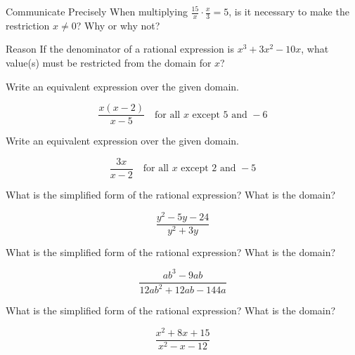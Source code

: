 \documentclass{article}
\newenvironment{practice}[2]{}{}        %
\newcommand{\answer}[1]{}               %
\begin{document}
\begin{practice}{18}{2}
Communicate Precisely When multiplying \(\frac{15}{x}\cdot\frac{x}{3}=5\), is it necessary to make the restriction \(x\ne0\)? Why or why not?
\answer{Yes; even though the factor of \(x\) was canceled out, the original fractions cannot be undefined, so the restriction is necessary.}
\end{practice}

\begin{practice}{19}{2}
Reason If the denominator of a rational expression is \(x^3+3x^2-10x\), what value(s) must be restricted from the domain for \(x\)?
\answer{\(-5\), \(0\), \(2\)}
\end{practice}

\begin{practice}{20}{1}
Write an equivalent expression over the given domain.

\[
\frac{x(x-2)}{x-5}\quad \text{for all }x\text{ except }5\text{ and }-6
\]
\answer{\(\frac{x^3+4x^2-12x}{x^2+x-30}\)}
\end{practice}

\begin{practice}{21}{1}
Write an equivalent expression over the given domain.

\[
\frac{3x}{x-2}\quad \text{for all }x\text{ except }2\text{ and }-5
\]
\answer{\(\frac{3x^2+15x}{x^2+3x-10}\)}
\end{practice}

\begin{practice}{22}{1}
What is the simplified form of the rational expression? What is the domain?

\[
\frac{y^2-5y-24}{y^2+3y}
\]
\answer{\(\frac{y-8}{y}\) for all \(y\) except \(0\) and \(-3\).}
\end{practice}

\begin{practice}{23}{1}
What is the simplified form of the rational expression? What is the domain?

\[
\frac{ab^3-9ab}{12ab^2+12ab-144a}
\]
\answer{\(\frac{b(b+3)}{12(b+4)}\) for all real numbers except \(a=0\), \(b=-4\) and \(3\).}
\end{practice}

\begin{practice}{24}{1}
What is the simplified form of the rational expression? What is the domain?

\[
\frac{x^2+8x+15}{x^2-x-12}
\]
\answer{\(\frac{x+5}{x-4}\), \(x\ne -3,4\).}
\end{practice}
\end{document}
